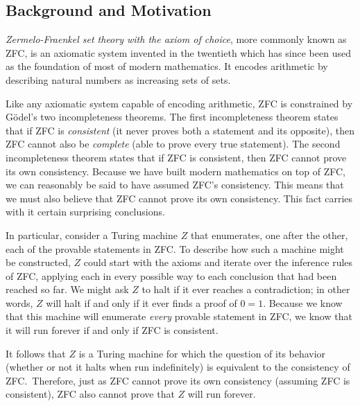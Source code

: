 \documentclass[11pt]{article}
\begin{document}
\subsection{Background and Motivation \label{sec:background}}

\emph{Zermelo-Fraenkel set theory with the axiom of choice}, more commonly known as ZFC, is an axiomatic system invented in the twentieth which has since been used as the foundation of most of modern mathematics. It encodes arithmetic by describing natural numbers as increasing sets of sets. 

Like any axiomatic system capable of encoding arithmetic, ZFC is constrained by G\"{o}del's two incompleteness theorems. The first incompleteness theorem states that if ZFC is \emph{consistent} (it never proves both a statement and its opposite), then ZFC cannot also be \emph{complete} (able to prove every true statement). The second incompleteness theorem states that if ZFC is consistent, then ZFC cannot prove its own consistency. Because we have built modern mathematics on top of ZFC, we can reasonably be said to have assumed ZFC's consistency. This means that we must also believe that ZFC cannot prove its own consistency. This fact carries with it certain surprising conclusions. 

In particular, consider a Turing machine $Z$ that enumerates, one after the other, each of the provable statements in ZFC. To describe how such a machine might be constructed, $Z$ could start with the axioms and iterate over the inference rules of ZFC, applying each in every possible way to each conclusion that had been reached so far. We might ask $Z$ to halt if it ever reaches a contradiction; in other words, $Z$ will halt if and only if it ever finds a proof of $0 = 1$. Because we know that this machine will enumerate \emph{every} provable statement in ZFC, we know that it will run forever if and only if ZFC is consistent. 

It follows that $Z$ is a Turing machine for which the question of its behavior (whether or not it halts when run indefinitely) is equivalent to the consistency of ZFC.\footnotemark~Therefore, just as ZFC cannot prove its own consistency (assuming ZFC is consistent), ZFC also cannot prove that $Z$ will run forever. 
\end{document}
